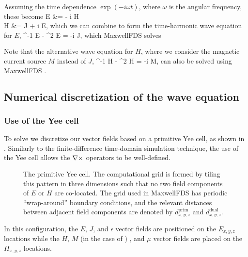 \documentclass{article}
\newcommand{\MaxwellFDS}{MaxwellFDS }
\newcommand{\prim}{\text{prim}}
\newcommand{\dual}{\text{dual}}
\begin{document}
Assuming the time dependence $\exp(-i \omega t)$, 
    where $\omega$ is the angular frequency,
    these become
    {\curl E &= - i \mu \omega H \\
    \curl H &= J + i \epsilon \omega E,}
    which we can combine to form the time-harmonic wave equation for $E$,
    {\curl \mu^{-1} \curl E - \epsilon \omega^2 E = -i \omega J,}
    which \MaxwellFDS solves

Note that the alternative wave equation for $H$,
    where we consider the magnetic current source $M$
    instead of $J$,
    {\curl \epsilon^{-1} \curl H - \mu \omega^2 H = -i \omega M,}
    can also be solved using \MaxwellFDS.

\subsection{Numerical discretization of the wave equation}
\subsubsection{Use of the Yee cell}
To solve  we discretize our vector fields 
    based on a primitive Yee cell, as shown in . %
Similarly to the finite-difference time-domain simulation technique,
    the use of the Yee cell allows the $\nabla\times$ operators to be well-defined.

\begin{figure}[ht]\begin{center}
    
    \end{center}
    \caption{   The primitive Yee cell. 
                The computational grid is formed by tiling this pattern
                    in three dimensions such that no two field components
                    of $E$ or $H$ are co-located. %
                The grid used in \MaxwellFDS has periodic ``wrap-around''
                    boundary conditions, and 
                    the relevant distances between adjacent field components
                    are denoted by $d^\prim_{x,y,z}$ and 
                    $d^\dual_{x,y,z}$.}
    \label{fig:yee cell}
\end{figure}

In this configuration, the $E$, $J$, and $\epsilon$ vector fields
    are positioned on the $E_{x,y,z}$ locations 
    while the $H$, $M$ (in the case of ) , and $\mu$
    vector fields are placed on the $H_{x,y,z}$ locations.
\end{document}
